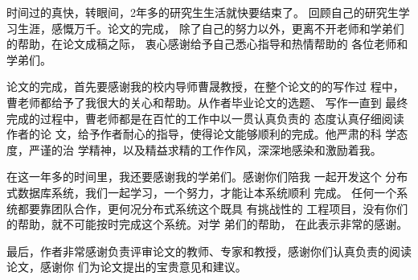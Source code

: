时间过的真快，转眼间，2年多的研究生生活就快要结束了。
回顾自己的研究生学习生涯，感慨万千。论文的完成，
除了自己的努力以外，更离不开老师和学弟们的帮助，在论文成稿之际，
衷心感谢给予自己悉心指导和热情帮助的
各位老师和学弟们。 

论文的完成，首先要感谢我的校内导师曹晟教授，在整个论文的的写作过
程中，曹老师都给予了我很大的关心和帮助。从作者毕业论文的选题、
写作一直到
最终完成的过程中，曹老师都是在百忙的工作中以一贯认真负责的
态度认真仔细阅读
作者的论
文，给予作者耐心的指导，使得论文能够顺利的完成。他严肃的科
学态度，严谨的治
学精神，以及精益求精的工作作风，深深地感染和激励着我。

在这一年多的时间里，我还要感谢我的学弟们。感谢你们陪我
一起开发这个
分布式数据库系统，我们一起学习，一个努力，才能让本系统顺利
完成。
任何一个系统都要靠团队合作，更何况分布式系统这个既具
有挑战性的
工程项目，没有你们的帮助，就不可能按时完成这个系统。对学
弟们的帮助，
在此表示非常的感谢。

最后，作者非常感谢负责评审论文的教师、专家和教授，感谢你们认真负责的阅读论文，感谢你
们为论文提出的宝贵意见和建议。